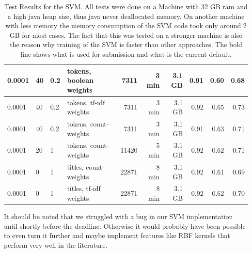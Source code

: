 \documentclass{article}
\begin{document}
\begin{table}[h]
{\begin{tabular}{|l|l|l|l|r|r|r|r|r|r|}
	0.0001 & 40 & 0.2 & tokens, boolean weights & 7311 & 3 min& 3.1 GB & 0.91 & 0.60 & 0.68\\ \hline
	0.0001 & 40 & 0.2 & tokens, tf-idf weights & 7311 & 3 min& 3.1 GB & 0.92 & 0.65 & 0.73\\ \hline
	0.0001 & 40 & 0.2 & tokens, count-weights & 7311 & 3 min& 3.1 GB & 0.91 & 0.63 & 0.71\\ \hline
	0.0001 & 20 & 1 & tokens, count-weights & 11420 & 5 min & 3.1 GB & 0.92 & 0.62 & 0.71\\ \hline
	0.0001 & 0 & 1 & titles, count-weights & 22871 & 8 min & 3.1 GB & 0.92 & 0.61 & 0.69\\ \hline
	0.0001 & 0 & 1 & titles, tf-idf weights & 22871 & 8 min & 3.1 GB & 0.92 & 0.62 & 0.70\\ \hline

	\end{tabular}
}

\caption{Test Results for the SVM. All tests were done on a Machine with 32 GB ram and a high java heap size, thus java never deallocated memory. On another machine with less memory the memory consumption of the SVM code took only around 2 GB for most cases. The fact that this was tested on a stronger machine is also the reason why training of the SVM is faster than other approaches. The bold line shows what is used for submission and what is the current default.}
\label{table:svmResults}
\end{table}

It should be noted that we struggled with a bug in our SVM implementation until shortly before the deadline. Otherwise it would probably have been possible to even turn it further and maybe implement features like RBF kernels that perform very well in the literature. 

\vspace{-2mm}
\tiny{\printbibliography}
\end{document}
